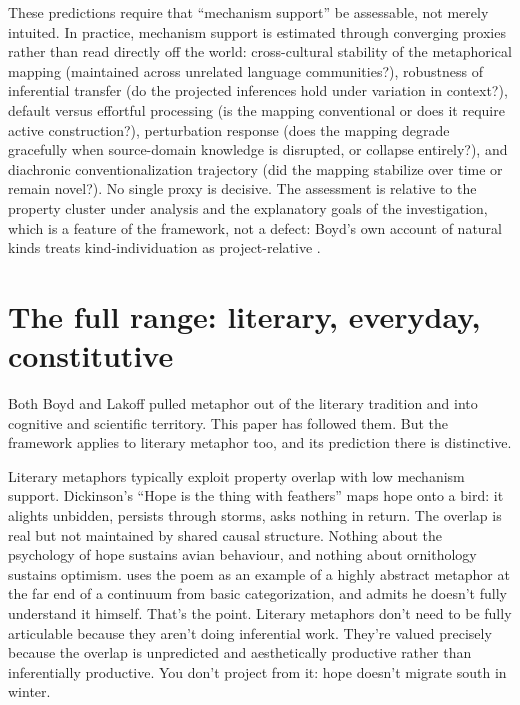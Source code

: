 \documentclass[12pt]{article}
\begin{document}
These predictions require that \enquote{mechanism support} be assessable, not merely intuited. In practice, mechanism support is estimated through converging proxies rather than read directly off the world: cross-cultural stability of the metaphorical mapping (maintained across unrelated language communities?), robustness of inferential transfer (do the projected inferences hold under variation in context?), default versus effortful processing (is the mapping conventional or does it require active construction?), perturbation response (does the mapping degrade gracefully when source-domain knowledge is disrupted, or collapse entirely?), and diachronic conventionalization trajectory (did the mapping stabilize over time or remain novel?). No single proxy is decisive. The assessment is relative to the property cluster under analysis and the explanatory goals of the investigation, which is a feature of the framework, not a defect: Boyd's own account of natural kinds treats kind-individuation as project-relative \citep[532]{boyd1979}.

\section{The full range: literary, everyday, constitutive}
\label{sec:literary}

Both Boyd and Lakoff pulled metaphor out of the literary tradition and into cognitive and scientific territory. This paper has followed them. But the framework applies to literary metaphor too, and its prediction there is distinctive.

Literary metaphors typically exploit property overlap with low mechanism support. Dickinson's \enquote{Hope is the thing with feathers} maps hope onto a bird: it alights unbidden, persists through storms, asks nothing in return. The overlap is real but not maintained by shared causal structure. Nothing about the psychology of hope sustains avian behaviour, and nothing about ornithology sustains optimism. \textcite{cooperrider2026} uses the poem as an example of a highly abstract metaphor at the far end of a continuum from basic categorization, and admits he doesn't fully understand it himself. That's the point. Literary metaphors don't need to be fully articulable because they aren't doing inferential work. They're valued precisely because the overlap is unpredicted and aesthetically productive rather than inferentially productive. You don't project from it: hope doesn't migrate south in winter.
\end{document}
